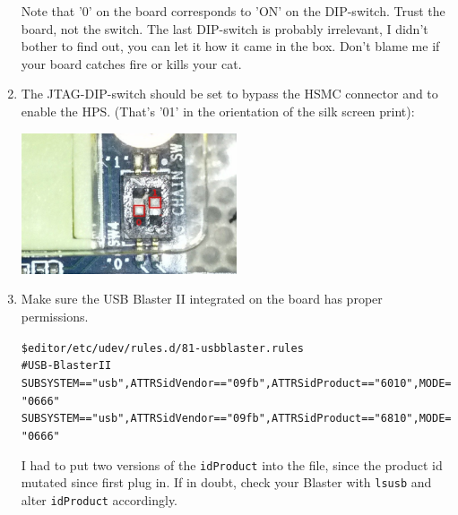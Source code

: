\documentclass[twoside]{article}
\begin{document}
\begin{enumerate}
Note that '0' on the board corresponds to 'ON' on the
DIP-switch. Trust the board, not the switch. The last DIP-switch is
probably irrelevant, I didn't bother to find out, you can let it how
it came in the box. Don't blame me if your board catches fire or
kills your cat.

\item The JTAG-DIP-switch should be set to bypass the HSMC connector
  and to enable the HPS. (That's '01' in the orientation of the silk
  screen print):

\includegraphics[width=0.5\textwidth]{jtagswitch.jpeg}

\item Make sure the USB Blaster II integrated on the board has proper
  permissions. 
  \begin{alltt}
\$ editor /etc/udev/rules.d/81-usbblaster.rules   
\hrulefill
# USB-Blaster II
SUBSYSTEM=="usb", ATTRS{idVendor}=="09fb", ATTRS{idProduct}=="6010", MODE="0666"
SUBSYSTEM=="usb", ATTRS{idVendor}=="09fb", ATTRS{idProduct}=="6810", MODE="0666"
\hrulefill
  \end{alltt}

  I had to put two versions of the \texttt{idProduct} into the file,
  since the product id mutated since first plug in. If in doubt, check
  your Blaster with \texttt{lsusb} and alter \texttt{idProduct}
  accordingly.
\end{enumerate}
\end{document}
